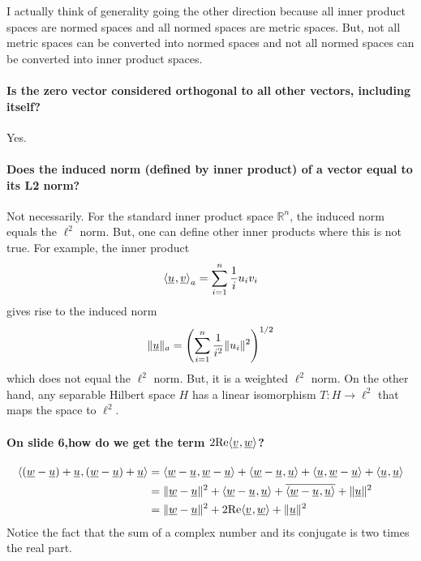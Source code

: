 \documentclass[10pt,english]{article}
\begin{document}
I actually think of generality going the other direction because all inner product spaces are normed spaces and all normed spaces are metric spaces.
But, not all metric spaces can be converted into normed spaces and not all normed spaces can be converted into inner product spaces.

\paragraph{Is the zero vector considered orthogonal to all other vectors, including itself?}
Yes.


\paragraph{Does the induced norm (defined by inner product) of a vector equal to its L2 norm?}
Not necessarily.
For the standard inner product space $\mathbb{R}^n$, the induced norm equals the $\ell^2$ norm.
But, one can define other inner products where this is not true.
For example, the inner product
\[ {\langle  \underline{u}  \mskip1mu ,  \underline{v}  \rangle}_a = \sum_{i=1}^n \frac{1}{i} u_i v_i \]
gives rise to the induced norm
\[ \| \underline{u} \|_a = \left( \sum_{i=1}^n \frac{1}{i^2} \|u_i \|^2 \right)^{1/2} \]
which does not equal the $\ell^2$ norm.
But, it is a weighted $\ell^2$ norm.
On the other hand, any separable Hilbert space $H$ has a linear isomorphism $T\colon H \to \ell^2$ that maps the space to $\ell^2$.


\paragraph{On slide 6,how do we get the term $2\mathrm{Re}{\langle  \underline{v} \mskip1mu , \underline{w}  \rangle}$?} 
\begin{equation*}
	\begin{aligned}
		{\langle  (\underline{w} - \underline{u}) + \underline{u} \mskip1mu , (\underline{w} - \underline{u}) + \underline{u}  \rangle} &= 
		{\langle \underline{w} - \underline{u}  \mskip1mu ,  \underline{w} - \underline{u}  \rangle} + {\langle  \underline{w} - \underline{u}  \mskip1mu ,  \underline{u}  \rangle} + {\langle  \underline{u}  \mskip1mu ,  \underline{w} - \underline{u}  \rangle} + {\langle \underline{u}  \mskip1mu ,  \underline{u}  \rangle} \\
		& = \| \underline{w} - \underline{u} \|^2 +  {\langle  \underline{w} - \underline{u}  \mskip1mu ,  \underline{u}  \rangle} + \overline{{\langle  \underline{w} - \underline{u}  \mskip1mu ,  \underline{u}  \rangle}} + \| \underline{u} \|^2 \\ 
		& = \| \underline{w} - \underline{u} \|^2 + 2\mathrm{Re}{\langle  \underline{v} \mskip1mu , \underline{w}  \rangle} + \| \underline{u} \|^2
		\end{aligned}
\end{equation*}
Notice the fact that the sum of a complex number and its conjugate is two times the real part.
\end{document}
